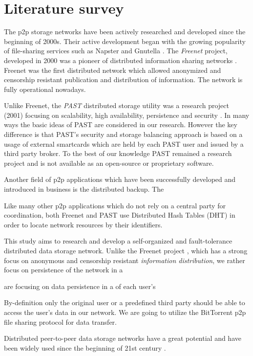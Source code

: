 \section{Literature survey}

The p2p storage networks have been actively researched and developed since
the beginning of 2000s. Their active development began with the growing
popularity of file-sharing services such as Napster \cite{napster}
and Gnutella \cite{gnutella}.
The \emph{Freenet} project, developed in 2000 was
a pioneer of distributed information sharing networks \cite{freenet}.
Freenet was the first distributed network which allowed anonymized
and censorship resistant publication and distribution of information.
The network is fully operational nowadays.

Unlike Freenet, the \emph{PAST} distributed storage utility was a
research project (2001) focusing on scalability, high availability, persistence
and security \cite{past}. In many ways the basic ideas of PAST are
considered in our research. However the key difference is that PAST's
security and storage balancing approach is based on a usage of external
smartcards which are held by each PAST user and issued by a third
party broker. To the best of our knowledge PAST remained a research
project and is not available as an open-source or proprietary software.

Another field of p2p applications which have been successfully developed
and introduced in business is the distributed backup. The 

Like many other p2p applications which do not rely on a central party
for coordination, both Freenet and PAST use Distributed Hash Tables (DHT)
in order to locate network resources by their identifiers.

This study aims to research and develop a self-organized and fault-tolerance
distributed data storage network. Unlike the Freenet project \cite{freenet},
which has a strong focus on anonymous and censorship resistant \emph{information
distribution}, we rather focus on persistence of the network in a

  are focusing on data persistence in a  of each user's

By-definition only the original user
or a predefined third party should be able to access the user's data
in our network. We are going to utilize the BitTorrent \cite{bittorrent-ma}
p2p file sharing protocol for data transfer.


Distributed peer-to-peer data storage networks have a great potential and have
been widely used since the beginning of 21st century
\cite{chord-01}.
